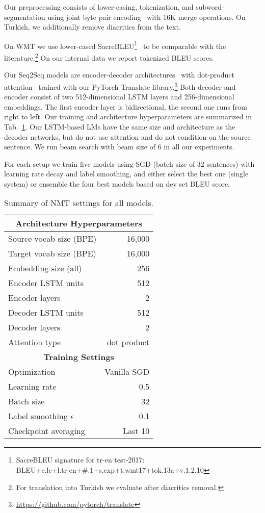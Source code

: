 \documentclass[11pt,a4paper]{article}
\begin{document}
Our preprocessing consists of lower-casing, tokenization, and subword-segmentation using joint byte pair encoding~\citep{bpe} with 16K merge operations. On Turkish, we additionally remove diacritics from the text.

On WMT we use lower-cased SacreBLEU\footnote{SacreBLEU signature for tr-en test-2017: \\
BLEU+c.lc+l.tr-en+\#.1+s.exp+t.wmt17+tok.13a+v.1.2.10}~\citep{sacrebleu} to be comparable with the literature.\footnote{For translation into Turkish we evaluate after diacritics removal.} On our internal data we report tokenized BLEU scores.


Our Seq2Seq models are encoder-decoder architectures~\citep{sutskever,bahdanau} with dot-product attention~\citep{luong-attention} trained with our PyTorch Translate library.\footnote{\url{https://github.com/pytorch/translate}} Both decoder and encoder consist of two 512-dimensional LSTM layers and 256-dimensional embeddings. The first encoder layer is bidirectional, the second one runs from right to left. Our training and architecture hyperparameters are summarized in Tab.~\ref{tab:hyperparam}. Our LSTM-based LMs have the same size and architecture as the decoder networks, but do not use attention and do not condition on the source sentence. We run beam search with beam size of 6 in all our experiments.

For each setup we train five models using SGD (batch size of 32 sentences) with learning rate decay and label smoothing, and either select the best one (single system) or ensemble the four best models based on dev set BLEU score.

\begin{table}[t!]
\centering
\small
\begin{tabular}{|l|r|}
\hline
\multicolumn{2}{|c|}{{\bf Architecture Hyperparameters}} \\
\hline
Source vocab size (BPE) & 16,000 \\
Target vocab size (BPE) & 16,000 \\
Embedding size (all) & 256 \\
Encoder LSTM units & 512 \\
Encoder layers & 2 \\
Decoder LSTM units & 512 \\
Decoder layers & 2 \\
Attention type & dot product \\
\hline \hline 
\multicolumn{2}{|c|}{{\bf Training Settings}} \\
\hline
Optimization & Vanilla SGD \\
Learning rate & 0.5 \\
Batch size & 32 \\
Label smoothing $\epsilon$ & 0.1 \\
Checkpoint averaging & Last 10 \\
\hline
\end{tabular}
\caption{Summary of NMT settings for all models.}\label{tab:hyperparam}
\end{table}
\end{document}
